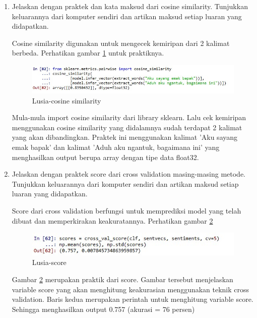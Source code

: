 \begin{enumerate}
\item Jelaskan dengan praktek dan kata maksud dari cosine similarity. Tunjukkan keluarannya dari komputer sendiri dan artikan maksud setiap luaran yang didapatkan.
	\par Cosine similarity digunakan untuk mengecek kemiripan dari 2 kalimat berbeda. Perhatikan gambar \ref{5b23} untuk praktiknya.
		\begin{figure}[!hbtp]
		\centering
		\includegraphics[scale=0.5]{figures/q8.jpg}
		\caption{Lusia-cosine similarity}
		\label{5b23}
		\end{figure}
	\par Mula-mula import cosine similarity dari library sklearn. Lalu cek kemiripan menggunakan cosine similarity yang didalamnya sudah terdapat 2 kalimat  yang akan dibandingkan. Praktek ini menggunakan kalimat 'Aku sayang emak bapak' dan kalimat 'Aduh aku ngantuk, bagaimana ini' yang menghasilkan output berupa array dengan tipe data float32.

\item Jelaskan dengan praktek score dari cross validation masing-masing metode. Tunjukkan keluarannya dari komputer sendiri dan artikan maksud setiap luaran yang didapatkan.
	\par Score dari cross validation berfungsi untuk memprediksi model yang telah dibuat dan memperkirakan keakuratannya. Perhatikan gambar \ref{5b24}
	 	\begin{figure}[!hbtp]
		\centering
		\includegraphics[scale=0.5]{figures/q9.jpg}
		\caption{Lusia-score}
		\label{5b24}
		\end{figure}
	\par Gambar \ref{5b24} merupakan praktik dari score. Gambar tersebut menjelaskan variable score yang akan menghitung keakurasian menggunakan teknik cross validation. Baris kedua merupakan perintah untuk menghitung variable score. Sehingga menghasilkan output 0.757 (akurasi = 76 persen)
\end{enumerate}


